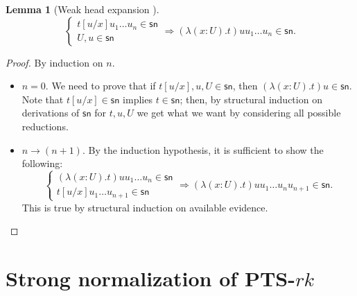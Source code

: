 \documentclass{article}
\newtheorem{lemma}{Lemma}
\theoremstyle{definition}
\theoremstyle{remark}
\begin{document}
\begin{lemma}[Weak head expansion
    \cite{joachimski2003short,
    vanraamsdonk1995normalisation,
    altenkirch1993constructions}\;]
\label{sn-whe}
    \[\left\{\begin{array}{l}
        t[u/x]u_1\ldots u_n\in\mathsf{sn} \\
        U,u\in\mathsf{sn}
    \end{array}\right.\Rightarrow
    (\lambda(x:U).t)u u_1\ldots u_n\in\mathsf{sn}.\]
\end{lemma}
\begin{proof}
    By induction on $n$.
    \begin{itemize}
        \item $n=0$. We need to prove that if
            $t[u/x],u,U\in\mathsf{sn}$, then
            $(\lambda(x:U).t)u\in\mathsf{sn}$.
            Note that $t[u/x]\in\mathsf{sn}$ implies
            $t\in\mathsf{sn}$; then, by structural
            induction on derivations of $\mathsf{sn}$
            for $t,u,U$ we get what we want by
            considering all possible reductions.
        \item $n\to(n+1)$. By the induction hypothesis,
            it is sufficient to show the following:
            \[\left\{\begin{array}{l}
                (\lambda(x:U).t)u u_1\ldots u_n
                    \in\mathsf{sn} \\
                t[u/x]u_1\ldots u_{n+1}\in\mathsf{sn}
            \end{array}\right.\Rightarrow
                (\lambda(x:U).t)u u_1\ldots u_n u_{n+1}
                    \in\mathsf{sn}.
            \]
            This is true by structural induction on
            available evidence.
    \end{itemize}
\end{proof}

\section{Strong normalization of
PTS-\texorpdfstring{$rk$}{rk}}
\label{rk-sn}
\end{document}
